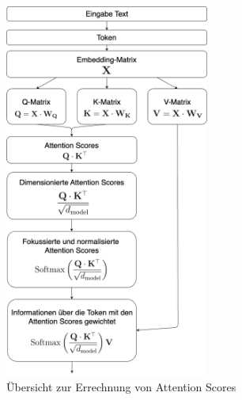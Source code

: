 \begin{figure}[ht]
	\centering
	\includegraphics[width=0.6\textwidth]{Bilder/scaled-dot-attention-math.png} 
	\caption{Übersicht zur Errechnung von Attention Scores}
	\label{fig:heatmap}
\end{figure}